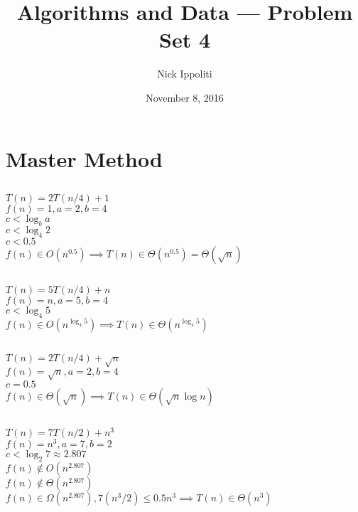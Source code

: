 \documentclass[14pt, letterpaper]{article}
\title{Algorithms and Data --- Problem Set 4}
\author{Nick Ippoliti}
\date{November 8, 2016}
\begin{document}
\begin{titlepage}
\maketitle
\end{titlepage}

\section{Master Method}
\subsection{}
$T(n) = 2T(n/4) + 1$ \\
$f(n) = 1, a = 2, b = 4$ \\
$c < \log_b a$\\
$c < \log_4 2$\\
$c < 0.5$\\
$f(n) \in O(n^{0.5}) \implies T(n) \in \Theta(n^{0.5}) = \Theta(\sqrt{n})$

\subsection{}
$T(n) = 5T(n/4) + n$ \\
$f(n) = n, a = 5, b = 4$ \\
$c < \log_4 5$ \\
$f(n) \in O(n^{\log_4 5}) \implies T(n) \in \Theta(n^{\log_4 5})$

\subsection{}
$T(n) = 2T(n/4) + \sqrt{n}$ \\
$f(n) = \sqrt{n}, a = 2, b = 4$ \\
$c = 0.5$ \\
$f(n) \in \Theta(\sqrt{n}) \implies T(n) \in \Theta(\sqrt{n}\log n)$

\subsection{}
$T(n) = 7T(n/2) + n^3$ \\
$f(n) = n^3, a = 7, b = 2$ \\
$c < \log_2 7 \approx 2.807$ \\
$f(n) \notin O(n^{2.807})$ \\
$f(n) \notin \Theta(n^{2.807})$ \\
$f(n) \in \Omega(n^{2.807}), 7(n^3/2) \leq 0.5n^3 \implies T(n) \in \Theta(n^3)$
\end{document}
